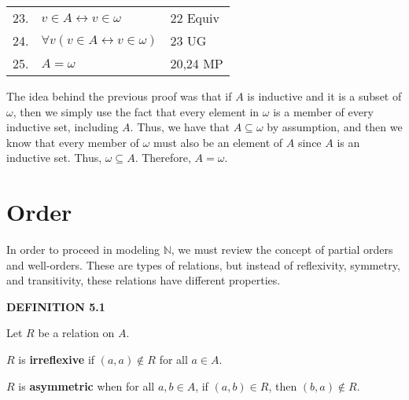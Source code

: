 \documentclass[12pt, a4paper]{article}
\begin{document}
\begin{table}[h!]
\begin{center}
\begin{tabular}{l l l}
        23.& $v\in A\leftrightarrow v\in\omega$ & 22 Equiv\\
        
        24.& $\forall v(v\in A\leftrightarrow v\in\omega)$ & 23 UG\\
        
        25.& $A=\omega$ & 20,24 MP\\    
        
        \hline
        \end{tabular}
    \end{center}
\end{table}

\newpage

\noindent The idea behind the previous proof was that if $A$ is inductive and it is a subset of $\omega$, then we simply use the fact that every element in $\omega$ is a member of every inductive set, including $A$. Thus, we have that $A\subseteq\omega$ by assumption, and then we know that every member of $\omega$ must also be an element of $A$ since $A$ is an inductive set. Thus, $\omega\subseteq A$. Therefore, $A=\omega$.

  

\newpage

\section{Order}

\noindent In order to proceed in modeling $\mathbb{N}$, we must review the concept of partial orders and well-orders. These are types of relations, but instead of reflexivity, symmetry, and transitivity, these relations have different properties.

\vspace{4mm}

\noindent\blacksquare\textbf{ DEFINITION 5.1}\par

\vspace{4mm}

Let $R$ be a relation on $A$.\par

\vspace{4mm}

\hspace{5mm} $R$ is \textbf{irreflexive} if $(a,a)\notin R$ for all $a\in A$.

\vspace{4mm}

\hspace{5mm} $R$ is \textbf{asymmetric} when for all $a,b\in A$, if $(a,b)\in R$, then $(b,a)\notin R$.
\end{document}
